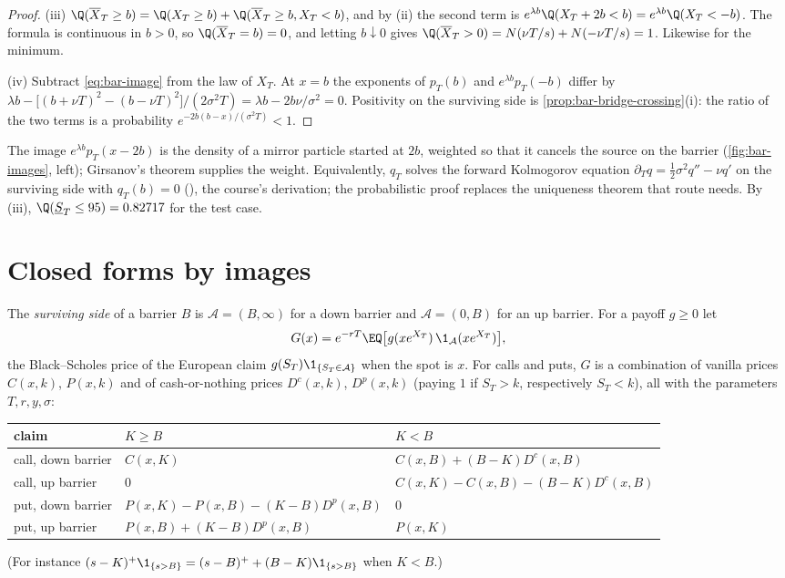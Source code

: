 \begin{proof}
(iii) $\Q(\overline X_T\ge b)=\Q(X_T\ge b)+\Q(\overline X_T\ge b,X_T<b)$, and by (ii) the second term is
$e^{\lambda b}\Q(X_T+2b<b)=e^{\lambda b}\Q(X_T<-b)$. The formula is continuous in $b>0$, so
$\Q(\overline X_T=b)=0$, and letting $b\downarrow0$ gives $\Q(\overline X_T>0)=N(\nu T/s)+N(-\nu T/s)=1$.
Likewise for the minimum.

(iv) Subtract \eqref{eq:bar-image} from the law of $X_T$. At $x=b$ the exponents of $p_T(b)$ and
$e^{\lambda b}p_T(-b)$ differ by
$\lambda b-\big[(b+\nu T)^2-(b-\nu T)^2\big]/(2\sigma^2T)=\lambda b-2b\nu/\sigma^2=0$. Positivity on the
surviving side is \cref{prop:bar-bridge-crossing}(i): the ratio of the two terms is a probability
$e^{-2b(b-x)/(\sigma^2T)}<1$.
\end{proof}

The image $e^{\lambda b}p_T(x-2b)$ is the density of a mirror particle started at $2b$, weighted so
that it cancels the source on the barrier (\cref{fig:bar-images}, left); Girsanov's theorem
supplies the weight. Equivalently, $q_T$ solves the forward Kolmogorov equation
$\partial_Tq=\frac12\sigma^2q''-\nu q'$ on the surviving side with $q_T(b)=0$ (), the
course's derivation; the probabilistic proof replaces the uniqueness theorem that route needs. By
(iii), $\Q(\underline S_T\le95)=0.82717$ for the test case.

\section{Closed forms by images}\label{sec:bar-images}

The \emph{surviving side} of a barrier $B$ is $\mathcal A=(B,\infty)$ for a down barrier and
$\mathcal A=(0,B)$ for an up barrier. For a payoff $g\ge0$ let
\begin{equation}\label{eq:bar-G}
  G(x)=e^{-rT}\EQ\big[g(xe^{X_T})\,\1_{\mathcal A}(xe^{X_T})\big],
\end{equation}
the Black--Scholes price of the European claim $g(S_T)\1_{\{S_T\in\mathcal A\}}$ when the spot is
$x$. For calls and puts, $G$ is a combination of vanilla prices $C(x,k)$, $P(x,k)$ and of
cash-or-nothing prices $D^c(x,k)$, $D^p(x,k)$ (paying $1$ if $S_T>k$, respectively $S_T<k$), all
with the parameters $T,r,y,\sigma$:
\begin{center}
\small
\begin{tabular}{@{}lll@{}}
\toprule
claim & $K\ge B$ & $K<B$\\
\midrule
call, down barrier & $C(x,K)$ & $C(x,B)+(B-K)D^c(x,B)$\\
call, up barrier & $0$ & $C(x,K)-C(x,B)-(B-K)D^c(x,B)$\\
put, down barrier & $P(x,K)-P(x,B)-(K-B)D^p(x,B)$ & $0$\\
put, up barrier & $P(x,B)+(K-B)D^p(x,B)$ & $P(x,K)$\\
\bottomrule
\end{tabular}
\end{center}
(For instance $(s-K)^+\1_{\{s>B\}}=(s-B)^++(B-K)\1_{\{s>B\}}$ when $K<B$.)

